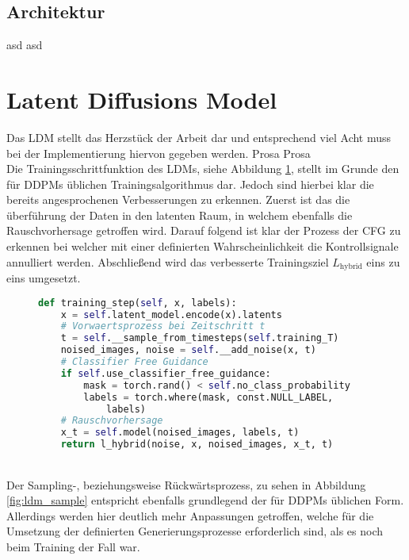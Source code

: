 \subsection{Architektur}

asd
asd

\section {Latent Diffusions Model}

Das LDM stellt das Herzstück der Arbeit dar und entsprechend viel Acht muss bei der Implementierung hiervon gegeben werden. Prosa Prosa \\ 
Die Trainingsschrittfunktion des LDMs, siehe Abbildung \ref{fig:ldm_training}, stellt im Grunde den für DDPMs üblichen Trainingsalgorithmus dar. Jedoch sind hierbei klar die bereits angesprochenen Verbesserungen zu erkennen. Zuerst ist das die überführung der Daten in den latenten Raum, in welchem ebenfalls die Rauschvorhersage getroffen wird. Darauf folgend ist klar der Prozess der CFG zu erkennen bei welcher mit einer definierten Wahrscheinlichkeit die Kontrollsignale annulliert werden. Abschließend wird das verbesserte Trainingsziel $L_\text{hybrid}$ eins zu eins umgesetzt.
\begin{figure}[htbp]
\begin{lstlisting}[language=python]
def training_step(self, x, labels):
    x = self.latent_model.encode(x).latents
    # Vorwaertsprozess bei Zeitschritt t
    t = self.__sample_from_timesteps(self.training_T)
    noised_images, noise = self.__add_noise(x, t)
    # Classifier Free Guidance
    if self.use_classifier_free_guidance: 
        mask = torch.rand() < self.no_class_probability
        labels = torch.where(mask, const.NULL_LABEL, 
            labels)   
    # Rauschvorhersage
    x_t = self.model(noised_images, labels, t)
    return l_hybrid(noise, x, noised_images, x_t, t)
\end{lstlisting}
    \captionsetup{type=figure}
    \label{fig:ldm_training}
\end{figure} \\
Der Sampling-, beziehungsweise Rückwärtsprozess, zu sehen in Abbildung \ref{fig:ldm_sample} entspricht ebenfalls grundlegend der für DDPMs üblichen Form. Allerdings werden hier deutlich mehr Anpassungen getroffen, welche für die Umsetzung der definierten Generierungsprozesse erforderlich sind, als es noch beim Training der Fall war. \\
